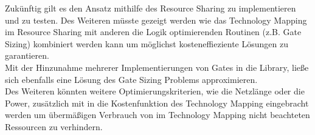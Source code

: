 \documentclass[11pt, a4paper, german]{article}
\newcommand{\TM}{Technology  Mapping }
\begin{document}
Zuk\"unftig gilt es den Ansatz mithilfe des Resource Sharing zu implementieren und zu testen. Des Weiteren m\"usste gezeigt werden wie das \TM im Resource Sharing mit anderen die Logik optimierenden Routinen (z.B. Gate Sizing) kombiniert werden kann um m\"oglichst kosteneffieziente L\"osungen zu garantieren.\\
Mit der Hinzunahme mehrerer Implementierungen von Gates in die Library, ließe sich ebenfalls eine Lösung des Gate Sizing Problems approximieren.\\
Des Weiteren k\"onnten weitere Optimierungskriterien, wie die Netzl\"ange oder die Power, zus\"atzlich mit in die Kostenfunktion des \TM eingebracht werden um \"uberm\"a{\ss}igen Verbrauch von im \TM nicht beachteten Ressourcen zu verhindern.\\

\newpage
{}
\nocite{*}
\renewcommand{\refname}{9 \,\, Literaturverzeichnis}
{ \footnotesize


}
\end{document}

